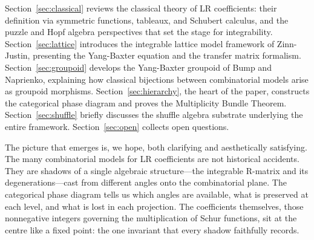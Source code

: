 Section~\ref{sec:classical} reviews the classical theory of LR coefficients:
their definition via symmetric functions, tableaux, and Schubert calculus, and
the puzzle and Hopf algebra perspectives that set the stage for integrability.
Section~\ref{sec:lattice} introduces the integrable lattice model framework of
Zinn-Justin, presenting the Yang-Baxter equation and the transfer matrix
formalism.  Section~\ref{sec:groupoid} develops the Yang-Baxter groupoid of
Bump and Naprienko, explaining how classical bijections between combinatorial
models arise as groupoid morphisms.  Section~\ref{sec:hierarchy}, the heart of
the paper, constructs the categorical phase diagram and proves the Multiplicity
Bundle Theorem.  Section~\ref{sec:shuffle} briefly discusses the shuffle algebra
substrate underlying the entire framework.
Section~\ref{sec:open} collects open questions.

The picture that emerges is, we hope, both clarifying and aesthetically
satisfying.  The many combinatorial models for LR coefficients are not
historical accidents.  They are shadows of a single algebraic structure---the
integrable R-matrix and its degenerations---cast from different angles onto the
combinatorial plane.  The categorical phase diagram tells us which angles are
available, what is preserved at each level, and what is lost in each projection.
The coefficients themselves, those nonnegative integers governing the
multiplication of Schur functions, sit at the centre like a fixed point: the one
invariant that every shadow faithfully records.
